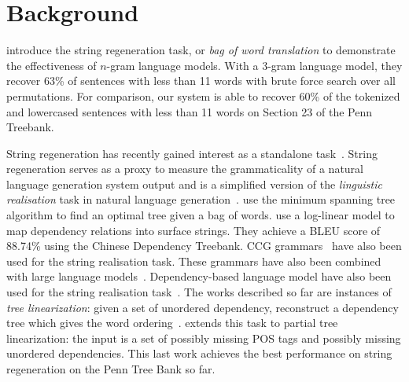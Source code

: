 \section{Background}

\citet{brown-cocke-dellapietra-dellapietra-jelinek-lafferty-mercer-roossin:1990:CL}
introduce the string regeneration task, or \emph{bag of word translation}
to demonstrate the effectiveness
of $n$-gram language models. With a 3-gram language model, they recover
63\% of sentences with less than 11 words with brute force search
over all permutations. For comparison, our system is able to recover
60\% of the tokenized and lowercased sentences with less than 11 words
on Section 23 of the Penn Treebank.

String regeneration has recently gained interest as
a standalone
task~\citep{wan-dras-dale-paris:2009:EACL,he-wang-guo-liu:2009:ACLIJCNLP,zhang-clark:2011:EMNLP,zhang-blackwood-clark:2012:EACL2012,zhang:2013:IJCAI}.
%
%
%
String regeneration serves as a proxy to measure the grammaticality of a
natural language generation system output and is a simplified version
of the \emph{linguistic realisation} task in natural language
generation~\citep{reiter-dale:1997:JNLE}.
\citet{wan-dras-dale-paris:2009:EACL} use the minimum spanning tree algorithm
to find an optimal tree given a bag of words.
\citet{he-wang-guo-liu:2009:ACLIJCNLP} use a log-linear model to map
dependency relations into surface strings. They achieve a BLEU
score of 88.74\% using the Chinese Dependency Treebank.
CCG grammars~\citep{zhang-clark:2011:EMNLP} have also been used
for the string realisation task. These grammars have also
been combined with large language
models~\citep{zhang-blackwood-clark:2012:EACL2012}.
Dependency-based language model have also been used for the
string realisation task~\citep{guo-wang-vanGenabith:2011:JNLE}.
The works described so far are instances of \emph{tree linearization}: given
a set of unordered dependency, reconstruct a dependency tree which gives
the word ordering~\citep{belz-bohnet-mille-wanner-white:2012:INLG}.
\citet{zhang:2013:IJCAI} extends this task to partial tree linearization: the
input is a set of possibly missing POS tags and possibly missing unordered
dependencies. This last work achieves the best performance on string regeneration
on the Penn Tree Bank so far.

